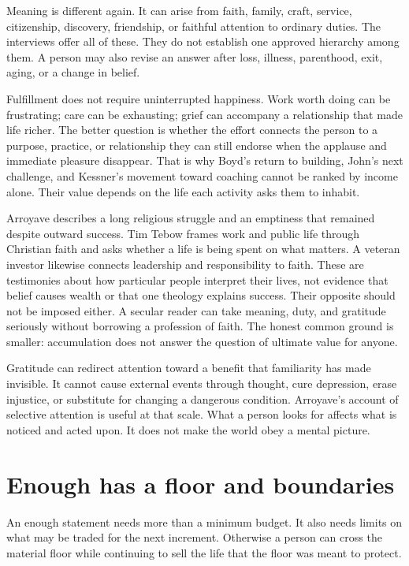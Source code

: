 Meaning is different again. It can arise from faith, family, craft, service,
citizenship, discovery, friendship, or faithful attention to ordinary duties.
The interviews offer all of these. They do not establish one approved
hierarchy among them. A person may also revise an answer after loss, illness,
parenthood, exit, aging, or a change in belief.

Fulfillment does not require uninterrupted happiness. Work worth doing can be
frustrating; care can be exhausting; grief can accompany a relationship that
made life richer. The better question is whether the effort connects the
person to a purpose, practice, or relationship they can still endorse when the
applause and immediate pleasure disappear. That is why Boyd's return to
building, John's next challenge, and Kessner's movement toward coaching cannot
be ranked by income alone. Their value depends on the life each activity asks
them to inhabit.

Arroyave describes a long religious struggle and an emptiness that remained
despite outward success. Tim Tebow frames work and public life through
Christian faith and asks whether a life is being spent on what matters. A
veteran investor likewise connects leadership and responsibility to faith.
These are testimonies about how particular people interpret their lives, not
evidence that belief causes wealth or that one theology explains success.
Their opposite should not be imposed either. A secular reader can take
meaning, duty, and gratitude seriously without borrowing a profession of
faith. The honest common ground is smaller: accumulation does not answer the
question of ultimate value for anyone.

Gratitude can redirect attention toward a benefit that familiarity has made
invisible. It cannot cause external events through thought, cure depression,
erase injustice, or substitute for changing a dangerous condition. Arroyave's
account of selective attention is useful at that scale. What a person looks
for affects what is noticed and acted upon. It does not make the world obey a
mental picture.

\section{Enough has a floor and boundaries}

An enough statement needs more than a minimum budget. It also needs limits on
what may be traded for the next increment. Otherwise a person can cross the
material floor while continuing to sell the life that the floor was meant to
protect.

